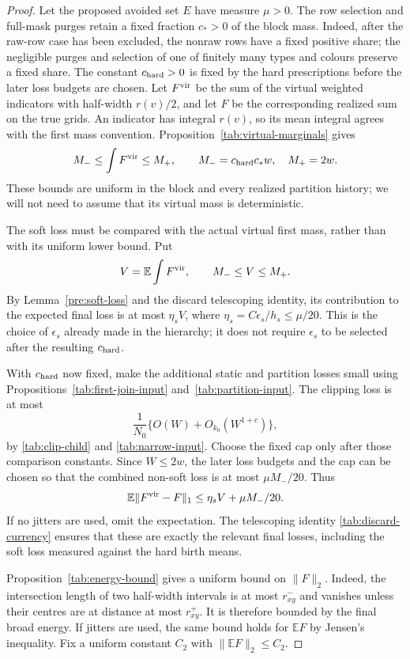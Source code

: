 \begin{proof}
Let the proposed avoided set $E$ have measure $\mu>0$.  The row
selection and full-mask purges retain a fixed fraction $c_*>0$
of the block mass.  Indeed, after the raw-row case has been
excluded, the nonraw rows have a fixed positive share; the
negligible purges and selection of one of finitely many types
and colours preserve a fixed share.  The constant
$c_{\rm hard}>0$ is fixed by the hard prescriptions before
the later loss budgets are chosen.  Let $F^{\rm vir}$ be the sum of the virtual
weighted indicators with half-width $r(v)/2$, and let $F$ be
the corresponding realized sum on the true grids.  An indicator
has integral $r(v)$, so its mean integral agrees with the first
mass convention.  Proposition~\ref{tab:virtual-marginals} gives
\[
 M_-\le\int F^{\rm vir}\le M_+,\qquad
 M_-=c_{\rm hard}c_*w,\quad M_+=2w.
\]
These bounds are uniform in the block and every realized
partition history; we will not need to assume that its virtual
mass is deterministic.

The soft loss must be compared with the actual virtual first mass,
rather than with its uniform lower bound. Put
\[
 V=\mathbb E\int F^{\rm vir},\qquad M_-\le V\le M_+.
\]
By Lemma~\ref{pre:soft-loss} and the discard telescoping identity,
its contribution to the expected final loss is at most $\eta_s V$,
where $\eta_s=C\epsilon_s/h_s\le\mu/20$. This is the choice of
$\epsilon_s$ already made in the hierarchy; it does not require
$\epsilon_s$ to be selected after the resulting $c_{\rm hard}$.

With $c_{\rm hard}$ now fixed, make the additional static and partition
losses small using Propositions~\ref{tab:first-join-input}
and~\ref{tab:partition-input}. The clipping loss is at most
\[
 \frac1{N_0}\{O(W)+O_{k_0}(W^{1+c})\},
\]
by \eqref{tab:clip-child} and \eqref{tab:narrow-input}.
Choose the fixed cap only after those comparison constants.
Since $W\le2w$, the later loss budgets and the cap can be chosen so
that the combined non-soft loss is at most $\mu M_-/20$. Thus
\[
 \mathbb E\|F^{\rm vir}-F\|_1
 \le \eta_s V+\mu M_-/20.
\]
If no jitters are used, omit the expectation. The telescoping identity
\eqref{tab:discard-currency} ensures that these are exactly the
relevant final losses, including the soft loss measured against the
hard birth means.

Proposition~\ref{tab:energy-bound} gives a uniform bound on
$\|F\|_2$.  Indeed, the intersection length of two half-width
intervals is at most $r_{xy}^-$ and vanishes unless their
centres are at distance at most $r_{xy}^+$.  It is therefore
bounded by the final broad energy.  If jitters are used, the
same bound holds for $\mathbb E F$ by Jensen's inequality.
Fix a uniform constant $C_2$ with $\|\mathbb E F\|_2\le C_2$.


\end{proof}
